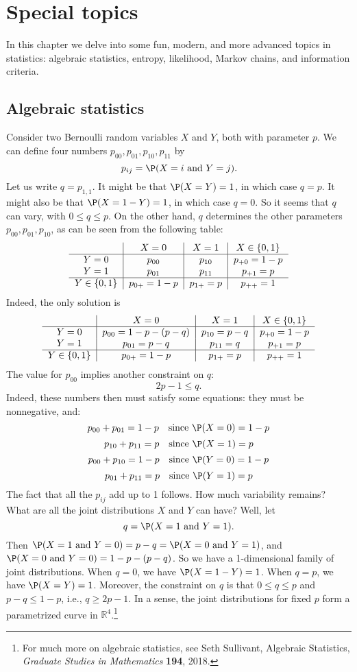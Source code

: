 \chapter{Special topics}\label{chMarkov}
In this chapter we delve into some fun, modern, and more advanced topics in statistics: algebraic statistics, entropy, likelihood, Markov chains, and information criteria.
\label{hmc}

\section{Algebraic statistics}\label{sec:algebraic}

Consider two Bernoulli random variables $X$ and $Y$, both with parameter $p$.
We can define four numbers $p_{00}, p_{01}, p_{10}, p_{11}$ by
\[
	p_{ij}=\P(X=i\text{ and }Y=j).
\]
Let us write $q=p_{1,1}$. It might be that $\P(X=Y)=1$, in which case $q=p$.
It might also be that $\P(X=1-Y)=1$, in which case $q=0$. So it seems that $q$ can vary, with $0\le q\le p$.
On the other hand, $q$ determines the other parameters $p_{00}, p_{01}, p_{10}$, as can be seen from the following table:
\[
\begin{tabular}{c|c|c|c}
		& $X=0$		& $X=1$		& $X\in\{0,1\}$\\
\hline
$Y=0$	& $p_{00}$	& $p_{10}$	& $p_{+0}=1-p$	\\
$Y=1$	& $p_{01}$	& $p_{11}$	& $p_{+1}=p$	\\
\hline
$Y\in\{0,1\}$	& $p_{0+}=1-p$	& $p_{1+}=p$	& $p_{++}=1$
\end{tabular}
\]
Indeed, the only solution is
\[
\begin{tabular}{c|c|c|c}
		& $X=0$		& $X=1$		& $X\in\{0,1\}$\\
\hline
$Y=0$	& $p_{00}=1-p-(p-q)$	& $p_{10}=p-q$	& $p_{+0}=1-p$	\\
$Y=1$	& $p_{01}=p-q$	& $p_{11}=q$	& $p_{+1}=p$	\\
\hline
$Y\in\{0,1\}$	& $p_{0+}=1-p$	& $p_{1+}=p$	& $p_{++}=1$
\end{tabular}
\]
The value for $p_{00}$ implies another constraint on $q$:
\[
	2p-1\le q.
\]
Indeed, these numbers then must satisfy some equations: they must be nonnegative, and:
\[
	p_{00}+p_{01}=1-p\quad\text{since $\P(X=0)=1-p$}
\]
\[
	p_{10}+p_{11}=p\quad\text{since $\P(X=1)=p$}
\]
\[
	p_{00}+p_{10}=1-p\quad\text{since $\P(Y=0)=1-p$}
\]
\[
	p_{01}+p_{11}=p\quad\text{since $\P(Y=1)=p$}
\]
The fact that all the $p_{ij}$ add up to 1 follows.
How much variability remains? What are all the joint distributions $X$ and $Y$ can have?
Well, let
\[
	q=\P(X=1\text{ and }Y=1).
\]
Then $\P(X=1\text{ and }Y=0)=p-q=\P(X=0\text{ and }Y=1)$, and $\P(X=0\text{ and }Y=0)=1-p-(p-q)$.
So we have a 1-dimensional family of joint distributions.
When $q=0$, we have $\P(X=1-Y)=1$. When $q=p$, we have $\P(X=Y)=1$.
Moreover, the constraint on $q$ is that $0\le q\le p$ and $p-q\le 1-p$, i.e., $q\ge 2p-1$.
In a sense, the joint distributions for fixed $p$ form a parametrized curve in $\mathbb R^4$.\footnote{For much more on algebraic statistics, see Seth Sullivant, Algebraic Statistics, \emph{Graduate Studies in Mathematics} \textbf{194}, 2018.}

